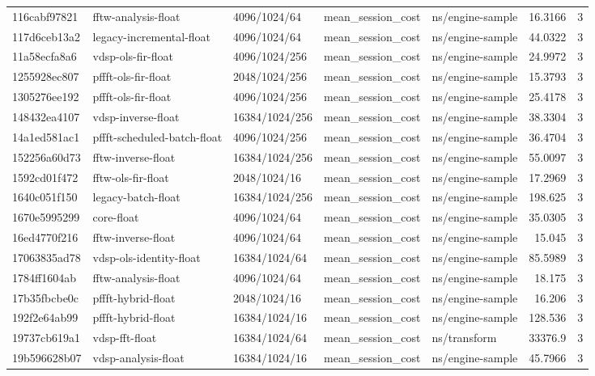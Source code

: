 \begin{longtable}{lllllrr}
116cabf97821 & fftw-analysis-float & 4096/1024/64 & mean\_session\_cost & ns/engine-sample & 16.3166 & 3 \\
117d6ceb13a2 & legacy-incremental-float & 4096/1024/64 & mean\_session\_cost & ns/engine-sample & 44.0322 & 3 \\
11a58ecfa8a6 & vdsp-ols-fir-float & 4096/1024/256 & mean\_session\_cost & ns/engine-sample & 24.9972 & 3 \\
1255928ec807 & pffft-ols-fir-float & 2048/1024/256 & mean\_session\_cost & ns/engine-sample & 15.3793 & 3 \\
1305276ee192 & pffft-ols-fir-float & 4096/1024/256 & mean\_session\_cost & ns/engine-sample & 25.4178 & 3 \\
148432ea4107 & vdsp-inverse-float & 16384/1024/256 & mean\_session\_cost & ns/engine-sample & 38.3304 & 3 \\
14a1ed581ac1 & pffft-scheduled-batch-float & 4096/1024/256 & mean\_session\_cost & ns/engine-sample & 36.4704 & 3 \\
152256a60d73 & fftw-inverse-float & 16384/1024/256 & mean\_session\_cost & ns/engine-sample & 55.0097 & 3 \\
1592cd01f472 & fftw-ols-fir-float & 2048/1024/16 & mean\_session\_cost & ns/engine-sample & 17.2969 & 3 \\
1640c051f150 & legacy-batch-float & 16384/1024/256 & mean\_session\_cost & ns/engine-sample & 198.625 & 3 \\
1670e5995299 & core-float & 4096/1024/64 & mean\_session\_cost & ns/engine-sample & 35.0305 & 3 \\
16ed4770f216 & fftw-inverse-float & 4096/1024/64 & mean\_session\_cost & ns/engine-sample & 15.045 & 3 \\
17063835ad78 & vdsp-ols-identity-float & 16384/1024/64 & mean\_session\_cost & ns/engine-sample & 85.5989 & 3 \\
1784ff1604ab & fftw-analysis-float & 4096/1024/64 & mean\_session\_cost & ns/engine-sample & 18.175 & 3 \\
17b35fbcbe0c & pffft-hybrid-float & 2048/1024/16 & mean\_session\_cost & ns/engine-sample & 16.206 & 3 \\
192f2e64ab99 & pffft-hybrid-float & 16384/1024/16 & mean\_session\_cost & ns/engine-sample & 128.536 & 3 \\
19737cb619a1 & vdsp-fft-float & 16384/1024/64 & mean\_session\_cost & ns/transform & 33376.9 & 3 \\
19b596628b07 & vdsp-analysis-float & 16384/1024/16 & mean\_session\_cost & ns/engine-sample & 45.7966 & 3 \\

\end{longtable}
